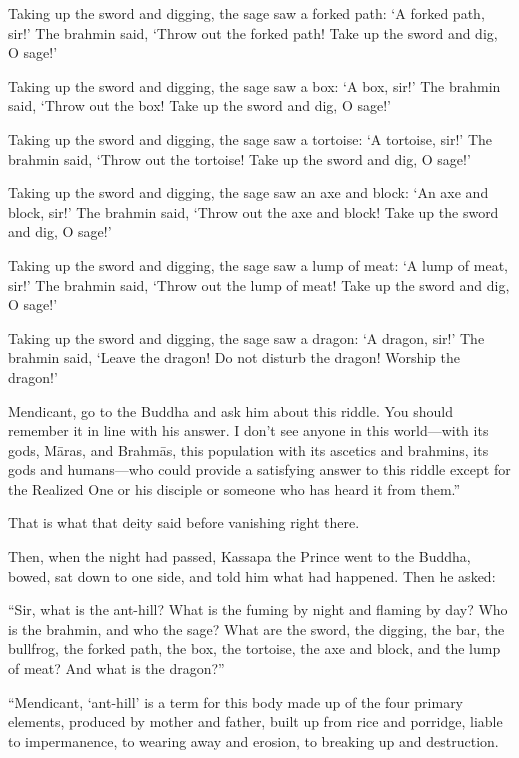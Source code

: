 \documentclass[12pt,openany]{book}%
\begin{document}
Taking up the sword and digging, the sage saw a forked path: ‘A forked path, sir!’ The brahmin said, ‘Throw out the forked path! Take up the sword and dig, O sage!’ 

Taking up the sword and digging, the sage saw a box: ‘A box, sir!’ The brahmin said, ‘Throw out the box! Take up the sword and dig, O sage!’ 

Taking up the sword and digging, the sage saw a tortoise: ‘A tortoise, sir!’ The brahmin said, ‘Throw out the tortoise! Take up the sword and dig, O sage!’ 

Taking up the sword and digging, the sage saw an axe and block: ‘An axe and block, sir!’ The brahmin said, ‘Throw out the axe and block! Take up the sword and dig, O sage!’ 

Taking up the sword and digging, the sage saw a lump of meat: ‘A lump of meat, sir!’ The brahmin said, ‘Throw out the lump of meat! Take up the sword and dig, O sage!’ 

Taking up the sword and digging, the sage saw a dragon: ‘A dragon, sir!’ The brahmin said, ‘Leave the dragon! Do not disturb the dragon! Worship the dragon!’ 

Mendicant, go to the Buddha and ask him about this riddle. You should remember it in line with his answer. I don’t see anyone in this world—with its gods, \textsanskrit{Māras}, and \textsanskrit{Brahmās}, this population with its ascetics and brahmins, its gods and humans—who could provide a satisfying answer to this riddle except for the Realized One or his disciple or someone who has heard it from them.” 

That is what that deity said before vanishing right there. 

Then, when the night had passed, Kassapa the Prince went to the Buddha, bowed, sat down to one side, and told him what had happened. Then he asked: 

“Sir, what is the ant-hill? What is the fuming by night and flaming by day? Who is the brahmin, and who the sage? What are the sword, the digging, the bar, the bullfrog, the forked path, the box, the tortoise, the axe and block, and the lump of meat? And what is the dragon?” 

“Mendicant, ‘ant-hill’ is a term for this body made up of the four primary elements, produced by mother and father, built up from rice and porridge, liable to impermanence, to wearing away and erosion, to breaking up and destruction. 
\end{document}
